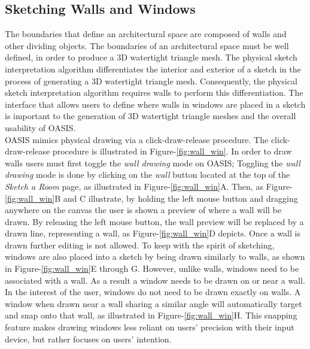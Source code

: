 \subsection{Sketching Walls and Windows}
The boundaries that define an architectural space are composed of walls and other dividing objects.
The  boundaries of an architectural space must be well defined, in order to produce a 3D watertight triangle mesh.
The physical sketch interpretation algorithm differentiates the interior and exterior of a sketch in the process of generating a 3D watertight triangle mesh.
Consequently, the physical sketch interpretation algorithm requires walls to perform this differentiation\cite{cutler2010interpreting}.
The interface that allows users to define where walls in windows are placed in a sketch is important to the generation of 3D watertight triangle meshes and the overall usability of OASIS.\\
 
OASIS mimics physical drawing via a click-draw-release procedure.
The click-draw-release procedure is illustrated in Figure-\ref{fig:wall_win}.
In order to draw walls users must first toggle the \textit{wall drawing} mode on OASIS;
Toggling the \textit{wall drawing} mode is done by clicking on the \textit{wall} button located at the top of the \textit{Sketch a Room} page, as illustrated in Figure-\ref{fig:wall_win}A.
Then, as Figure-\ref{fig:wall_win}B and C illustrate, by holding the left mouse button and dragging anywhere on the canvas the user is shown a preview of where a wall will be drawn.
By releasing the left mouse button, the wall preview will be replaced by a drawn line, representing a wall, as Figure-\ref{fig:wall_win}D depicts.
Once a wall is drawn further editing is not allowed.
To keep with the spirit of sketching, windows are also placed into a sketch by being drawn similarly to walls, as shown in Figure-\ref{fig:wall_win}E through G.
However, unlike walls, windows need to be associated with a wall.
As a result a window needs to be drawn on or near a wall.
In the interest of the user, windows do not need to be drawn exactly on walls.
A window when drawn near a wall sharing a similar angle will automatically target and snap onto that wall, as illustrated in Figure-\ref{fig:wall_win}H.
This snapping feature makes drawing windows less reliant on users' precision with their input device, but rather focuses on users' intention. \\


